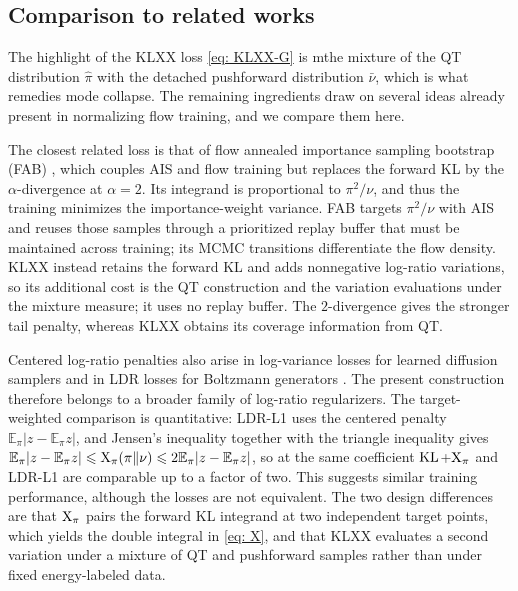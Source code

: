 \documentclass{article}
\begin{document}
\subsection{Comparison to related works}
\label{subsec: loss-related}

The highlight of the KLXX loss \eqref{eq: KLXX-G} is mthe mixture of the QT distribution $\hat\pi$ with the detached pushforward distribution $\bar\nu$, which is what remedies mode collapse. The remaining ingredients draw on several ideas already present in normalizing flow training, and we compare them here.

The closest related loss is that of flow annealed importance sampling bootstrap (FAB) \citep{midgley2022flow}, which couples AIS and flow training but replaces the forward KL by the $\alpha$-divergence at $\alpha=2$. Its integrand is proportional to $\pi^2/\nu$, {\color{blue}and thus the training minimizes the importance-weight variance}. FAB targets $\pi^2/\nu$ with AIS and reuses those samples through a prioritized replay buffer that must be maintained across training; its MCMC transitions differentiate the flow density. KLXX instead retains the forward KL and adds nonnegative log-ratio variations, so its additional cost is the QT construction and the variation evaluations under the mixture measure; it uses no replay buffer. The $2$-divergence gives the stronger tail penalty, whereas KLXX obtains its coverage information from QT.

Centered log-ratio penalties also arise in log-variance losses for learned diffusion samplers \citep{richter2024improved} and in LDR losses for Boltzmann generators \citep{schopmans2026ldr}. The present construction therefore belongs to a broader family of log-ratio regularizers. The target-weighted comparison is quantitative: LDR-L1 uses the centered penalty $\mathbb E_\pi|z-\mathbb E_\pi z|$, and Jensen's inequality together with the triangle inequality gives $\mathbb E_\pi|z-\mathbb E_\pi z|\leqslant\mathrm{X}_\pi(\pi\|\nu)\leqslant2\mathbb E_\pi|z-\mathbb E_\pi z|$, so at the same coefficient $\mathrm{KL}$+$\mathrm{X}_\pi$ and LDR-L1 are comparable up to a factor of two. This suggests similar training performance, although the losses are not equivalent. The two design differences are that $\mathrm{X}_\pi$ pairs the forward KL integrand at two independent target points, which yields the double integral in \eqref{eq: X}, and that KLXX evaluates a second variation under a mixture of QT and pushforward samples rather than under fixed energy-labeled data.
\end{document}
